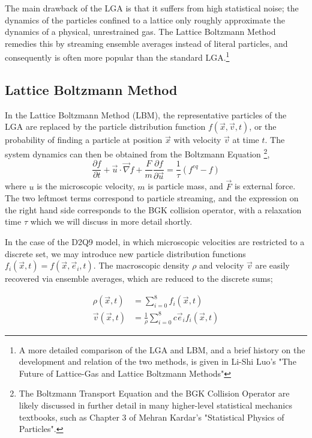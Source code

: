 \documentclass[a4paper]{article}
\begin{document}
The main drawback of the LGA is that it suffers from high statistical noise\cite{latticehistory}; the dynamics of the particles confined to a lattice only roughly approximate the dynamics of a physical, unrestrained gas. The Lattice Boltzmann Method remedies this by streaming ensemble averages instead of literal particles, and consequently is often more popular than the standard LGA.\footnote{A more detailed comparison of the LGA and LBM, and a brief history on the development and relation of the two methods, is given in Li-Shi Luo's "The Future of Lattice-Gas and Lattice Boltzmann Methods"}

\subsection{Lattice Boltzmann Method}
In the Lattice Boltzmann Method (LBM), the representative particles of the LGA are replaced by the particle distribution function $f(\vec{x}, \vec{v}, t)$, or the probability of finding a particle at position $\vec{x}$ with velocity $\vec{v}$ at time $t$. The system dynamics can then be obtained from the Boltzmann Equation \footnote{The Boltzmann Transport Equation and the BGK Collision Operator are likely discussed in further detail in many higher-level statistical mechanics textbooks, such as Chapter 3 of Mehran Kardar's "Statistical Physics of Particles".},
\begin{equation}
    \frac{\partial f}{\partial t} + \vec{u}\cdot \vec{\nabla} f + \frac{F}{m}\frac{\partial f}{\partial \vec{u}} = \frac{1}{\tau}(f^{eq} - f)
\end{equation}
where $u$ is the microscopic velocity, $m$ is particle mass, and $\vec{F}$ is external force. The two leftmost terms correspond to particle streaming, and the expression on the right hand side corresponds to the BGK collision operator, with a relaxation time $\tau$ which we will discuss in more detail shortly.

In the case of the D2Q9 model, in which microscopic velocities are restricted to a discrete set, we may introduce new particle distribution functions $f_i(\vec{x}, t) = f(\vec{x}, \vec{e}_i, t)$. The macroscopic density $\rho$ and velocity $\vec{v}$ are easily recovered via ensemble averages, which are reduced to the discrete sums;

\begin{align}
    \rho(\vec{x}, t) &= \sum_{i=0}^8 f_i(\vec{x}, t) \\
    \vec{v}(\vec{x}, t) &= \frac{1}{\rho} \sum_{i=0}^8 c\vec{e}_i f_i(\vec{x}, t) 
\end{align}
\end{document}
